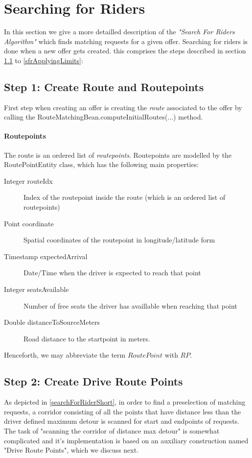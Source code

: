 \chapter{Searching for Riders}
\label{searchForRiders}
In this section we give a more detailled description of the \emph{"Search For Riders Algorithm"}
which finds matching requests for a given offer.
Searching for riders is done when a new offer gets created. this comprises the 
steps described in section \ref{sfrCreatingRoute} to \ref{sfrApplyingLimits}:


\section{Step 1: Create Route and Routepoints}
\label{sfrCreatingRoute}

First step when creating an offer is creating the \emph{route} associated to the offer
by calling the RouteMatchingBean.computeInitialRoutes(...) method.
\subsubsection{Routepoints}
The route is an ordered list of \emph{routepoints}. Routepoints are modelled by the 
RoutePointEntity class, which has the following main properties:
\begin{description}
     	 \item[Integer routeIdx]{Index of the routepoint inside the route (which is an ordered list of routepoints)} 
	 \item[Point coordinate]{Spatial coordinates of the routepoint in longitude/latitude form} 
  	 \item[Timestamp expectedArrival]{Date/Time when the driver is expected to reach that point}     
    	 \item[Integer seatsAvailable]{Number of free seats the driver has availlable when reaching that point} 
	 \item[Double distanceToSourceMeters]{Road distance to the startpoint in meters.} 
\end{description}

Henceforth, we may abbreviate the term $RoutePoint$ with $RP$.

\section{Step 2: Create Drive Route Points}
\label{sfrScanningTheCorridor}
As depicted in \ref{searchForRiderShort}, in order to find a preselection of matching requests,
a corridor consisting of all the points that have distance less than the driver defined maximum detour 
is scanned for start and endpoints of requests.
The task of "scanning the corridor of distance max detour" is somewhat complicated and it's 
implementation is based on an auxiliary construction named "Drive Route Points", which we discuss next.
 
